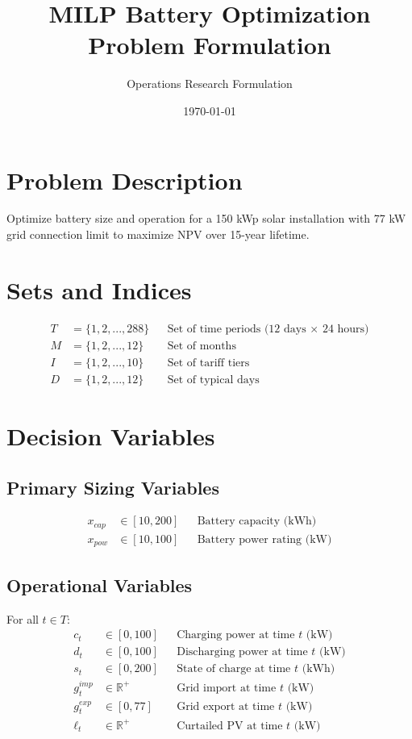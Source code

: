\documentclass{article}
\title{MILP Battery Optimization Problem Formulation}
\author{Operations Research Formulation}
\date{\today}
\begin{document}
\maketitle

\section{Problem Description}
Optimize battery size and operation for a 150 kWp solar installation with 77 kW grid connection limit to maximize NPV over 15-year lifetime.

\section{Sets and Indices}
\begin{align}
T &= \{1, 2, ..., 288\} && \text{Set of time periods (12 days × 24 hours)}\\
M &= \{1, 2, ..., 12\} && \text{Set of months}\\
I &= \{1, 2, ..., 10\} && \text{Set of tariff tiers}\\
D &= \{1, 2, ..., 12\} && \text{Set of typical days}
\end{align}

\section{Decision Variables}

\subsection{Primary Sizing Variables}
\begin{align}
x_{cap} &\in [10, 200] && \text{Battery capacity (kWh)}\\
x_{pow} &\in [10, 100] && \text{Battery power rating (kW)}
\end{align}

\subsection{Operational Variables}
For all $t \in T$:
\begin{align}
c_t &\in [0, 100] && \text{Charging power at time } t \text{ (kW)}\\
d_t &\in [0, 100] && \text{Discharging power at time } t \text{ (kW)}\\
s_t &\in [0, 200] && \text{State of charge at time } t \text{ (kWh)}\\
g^{imp}_t &\in \mathbb{R}^+ && \text{Grid import at time } t \text{ (kW)}\\
g^{exp}_t &\in [0, 77] && \text{Grid export at time } t \text{ (kW)}\\
\ell_t &\in \mathbb{R}^+ && \text{Curtailed PV at time } t \text{ (kW)}
\end{align}
\end{document}
